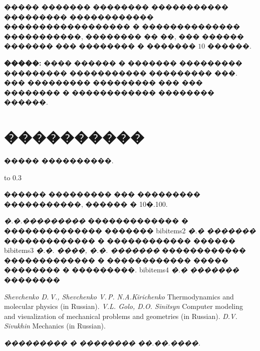 ����� ������� �������� ����������� ��������� ������������ ������������������ � �������������� �����������, �������� �� ��, ���
������ ������� ��� �������� � ������� $10$ ������.

\textbf{�����:}
���� ������ � ������� ��������� ��������� ����������� ��������� ���. ��� ��������� ��������� ��� ��� �������� � ������������ �������� ������.

\section{����������}

����� ����������.

\hfil \hbox to 0.3\textwidth{\hrulefill} \smallskip

������ ��������� ��� ��������� �����������, ������ � 10�.100.

\begin{thebibliography}{99}

     \textit{�.�.���������} ������������� � �������������� ������� %
    bibitem{s2} \textit{�.� �������} ������������� � ������������ ������ %
    bibitem{s3} \textit{�.�. ����, �.�. �������} ������������ ������������� � ������������ ����� �������� �
    ���������. %
    bibitem{s4} \textit{�.� �������} ��������

\end{thebibliography}

\begin{thebibliography}{99}

     \textit{Shevchenko D.\,V., Shevchenko V.\,P.}  %
      \textit{N.A.Kirichenko} Thermodynamics and molecular physics (in Russian). %
      \textit{V.L. Golo, D.O. Sinitsyn} Computer modeling and visualization of mechanical problems and geometries (in Russian). %
      \textit{D.V. Sivukhin} Mechanics (in Russian).

\end{thebibliography}

\begin{flushright}
    \textit{��������� � �������� ��.��.����.}
\end{flushright}

